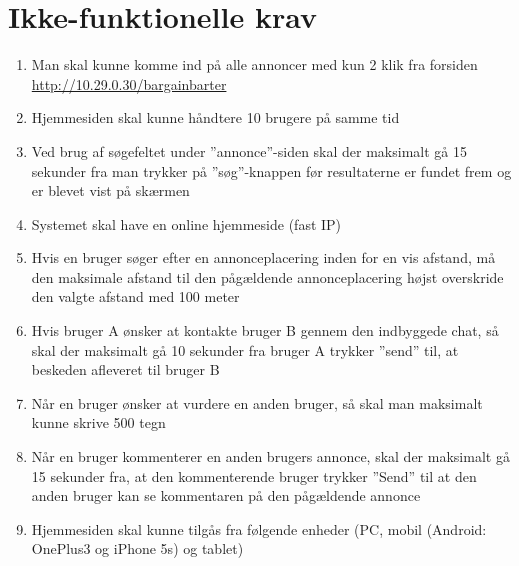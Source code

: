 \chapter{Ikke-funktionelle krav}\label{ch:Ikkefunktionelle}

\begin{enumerate}
	\item Man skal kunne komme ind på alle annoncer med kun 2 klik fra forsiden \url{http://10.29.0.30/bargainbarter}
	
	\item Hjemmesiden skal kunne håndtere 10 brugere på samme tid
	
	\item Ved brug af søgefeltet under ''annonce''-siden skal der maksimalt gå 15 sekunder fra man trykker på ''søg''-knappen før resultaterne er fundet frem og er blevet vist på skærmen
	
	\item Systemet skal have en online hjemmeside (fast IP)
		
	\item Hvis en bruger søger efter en annonceplacering inden for en vis afstand, må den maksimale afstand til den pågældende annonceplacering højst overskride den valgte afstand med 100 meter
	
	\item Hvis bruger A ønsker at kontakte bruger B gennem den indbyggede chat, så skal der maksimalt  gå 10 sekunder fra bruger A trykker ''send'' til, at beskeden afleveret til bruger B
	
	\item Når en bruger ønsker at vurdere en anden bruger, så skal man maksimalt kunne skrive 500 tegn
	
	\item Når en bruger kommenterer en anden brugers annonce, skal der maksimalt gå 15 sekunder fra, at den kommenterende bruger trykker ''Send'' til at den anden bruger kan se kommentaren på den pågældende annonce
	
	\item Hjemmesiden skal kunne tilgås fra følgende enheder (PC, mobil (Android: OnePlus3 og iPhone 5s) og tablet)
	
\end{enumerate}